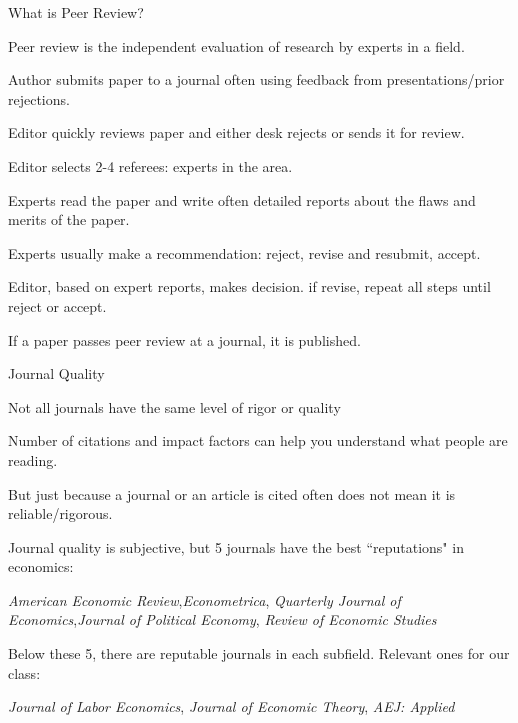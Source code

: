 \documentclass[aspectratio=169,usenames,dvipsnames]{beamer}
\newenvironment{wideitemize}{\itemize\addtolength{\itemsep}{10pt}}{\enditemize}
\begin{document}
\begin{frame}{What is Peer Review?}

\begin{wideitemize}
    \item Peer review is the independent evaluation of research by experts in a field.
    \begin{wideitemize}
        \item Author submits paper to a journal often using feedback from presentations/prior rejections.
        \item Editor quickly reviews paper and either desk rejects or sends it for review.
        \item Editor selects 2-4 referees: experts in the area.
        \item Experts read the paper and write often detailed reports about the flaws and merits of the paper.
        \item Experts usually make a recommendation: reject, revise and resubmit, accept.
        \item Editor, based on expert reports, makes decision. if revise, repeat all steps until reject or accept.
    \end{wideitemize}
    \item If a paper passes peer review at a journal, it is published.
\end{wideitemize}
    
\end{frame}


\begin{frame}{Journal Quality}

    \begin{wideitemize}
        \item Not all journals have the same level of rigor or quality
        \item Number of citations and impact factors can help you understand what people are reading.
        \item But just because a journal or an article is cited often does not mean it is reliable/rigorous.
        \item Journal quality is subjective, but 5 journals have the best ``reputations" in economics:
        \begin{wideitemize}
            \item \textit{American Economic Review},\textit{Econometrica}, \textit{Quarterly Journal of Economics},\textit{Journal of Political Economy}, \textit{Review of Economic Studies} 
        \end{wideitemize}
        \item Below these 5, there are reputable journals in each subfield. Relevant ones for our class:
        \begin{wideitemize}
            \item \textit{Journal of Labor Economics}, \textit{Journal of Economic Theory}, \textit{AEJ: Applied}
        \end{wideitemize}
    \end{wideitemize}
\end{frame}
\end{document}
